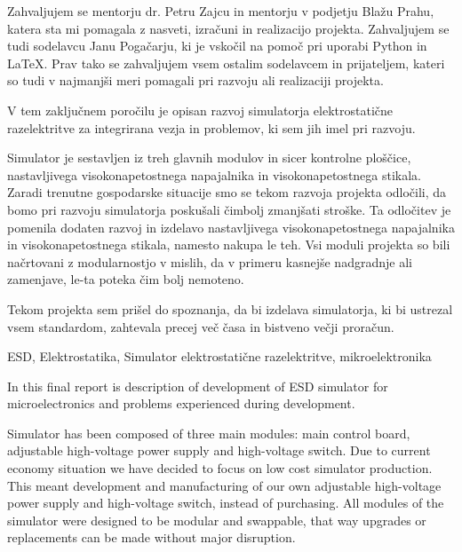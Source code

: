 \documentclass[a4paper,twoside,openright,12pt,Slovene]{book}
\date{Ljubljana, \the\year}
\begin{document}
\frontmatter


\maketitle

\zahvala
Zahvaljujem se mentorju dr. Petru Zajcu in mentorju v podjetju Blažu Prahu, katera sta mi pomagala z nasveti, izračuni in realizacijo projekta. Zahvaljujem se tudi sodelavcu Janu Pogačarju, ki je vskočil na pomoč pri uporabi Python in LaTeX. Prav tako se zahvaljujem vsem ostalim sodelavcem in prijateljem, kateri so tudi v najmanjši meri pomagali pri razvoju ali realizaciji projekta.


\povzetek
V tem zaključnem poročilu je opisan razvoj simulatorja elektrostatične razelektritve za integrirana vezja in problemov, ki sem jih imel pri razvoju. 

Simulator je sestavljen iz treh glavnih modulov in sicer kontrolne ploščice, nastavljivega visokonapetostnega napajalnika in visokonapetostnega stikala.
Zaradi trenutne gospodarske situacije smo se tekom razvoja projekta odločili, da bomo pri razvoju simulatorja poskušali čimbolj zmanjšati stroške. Ta odločitev je pomenila dodaten razvoj in izdelavo nastavljivega visokonapetostnega napajalnika in visokonapetostnega stikala, namesto nakupa le teh. 
Vsi moduli projekta so bili načrtovani z modularnostjo v mislih, da v primeru kasnejše nadgradnje ali zamenjave, le-ta poteka čim bolj nemoteno. 

Tekom projekta sem prišel do spoznanja, da bi izdelava simulatorja, ki bi ustrezal vsem standardom, zahtevala precej več časa in bistveno večji proračun.

\kljucnebesede
ESD, Elektrostatika, Simulator elektrostatične razelektritve, mikroelektronika



\abstract
In this final report is description of development of ESD simulator for microelectronics and problems experienced during development. 

Simulator has been composed of three main modules: main control board, adjustable high-voltage power supply and high-voltage switch. Due to current economy situation we have decided to focus on low cost simulator production. This meant development and manufacturing of our own adjustable high-voltage power supply and high-voltage switch, instead of purchasing. All modules of the simulator were designed to be modular and swappable, that way upgrades or replacements can be made without major disruption. 
\end{document}
